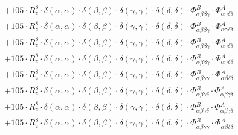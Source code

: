 \documentclass{article}
\begin{document}
\begin{subequations}
\begin{gather}
\begin{array}{c}
 \\[0.2em] 		 + 105 \cdot R_{z}^{8} \cdot \delta{}\left(\alpha{}, \alpha{}\right) \cdot \delta{}\left(\beta{}, \beta{}\right) \cdot \delta{}\left(\gamma{}, \gamma{}\right) \cdot \delta{}\left(\delta{}, \delta{}\right) \cdot \Phi{}^{B}_{\alpha{}\beta{}\beta{}\gamma{}} \cdot \Phi{}^{A}_{\alpha{}\gamma{}\delta{}\delta{}} 
 \\[0.2em] 		 + 105 \cdot R_{z}^{8} \cdot \delta{}\left(\alpha{}, \alpha{}\right) \cdot \delta{}\left(\beta{}, \beta{}\right) \cdot \delta{}\left(\gamma{}, \gamma{}\right) \cdot \delta{}\left(\delta{}, \delta{}\right) \cdot \Phi{}^{B}_{\alpha{}\beta{}\beta{}\gamma{}} \cdot \Phi{}^{A}_{\alpha{}\gamma{}\delta{}\delta{}} 
 \\[0.2em] 		 + 105 \cdot R_{z}^{8} \cdot \delta{}\left(\alpha{}, \alpha{}\right) \cdot \delta{}\left(\beta{}, \beta{}\right) \cdot \delta{}\left(\gamma{}, \gamma{}\right) \cdot \delta{}\left(\delta{}, \delta{}\right) \cdot \Phi{}^{B}_{\alpha{}\beta{}\beta{}\gamma{}} \cdot \Phi{}^{A}_{\alpha{}\gamma{}\delta{}\delta{}} 
 \\[0.2em] 		 + 105 \cdot R_{z}^{8} \cdot \delta{}\left(\alpha{}, \alpha{}\right) \cdot \delta{}\left(\beta{}, \beta{}\right) \cdot \delta{}\left(\gamma{}, \gamma{}\right) \cdot \delta{}\left(\delta{}, \delta{}\right) \cdot \Phi{}^{B}_{\alpha{}\beta{}\beta{}\gamma{}} \cdot \Phi{}^{A}_{\alpha{}\gamma{}\delta{}\delta{}} 
 \\[0.2em] 		 + 105 \cdot R_{z}^{8} \cdot \delta{}\left(\alpha{}, \alpha{}\right) \cdot \delta{}\left(\beta{}, \beta{}\right) \cdot \delta{}\left(\gamma{}, \gamma{}\right) \cdot \delta{}\left(\delta{}, \delta{}\right) \cdot \Phi{}^{B}_{\alpha{}\beta{}\gamma{}\gamma{}} \cdot \Phi{}^{A}_{\alpha{}\beta{}\delta{}\delta{}} 
 \\[0.2em] 		 + 105 \cdot R_{z}^{8} \cdot \delta{}\left(\alpha{}, \alpha{}\right) \cdot \delta{}\left(\beta{}, \beta{}\right) \cdot \delta{}\left(\gamma{}, \gamma{}\right) \cdot \delta{}\left(\delta{}, \delta{}\right) \cdot \Phi{}^{B}_{\alpha{}\beta{}\gamma{}\delta{}} \cdot \Phi{}^{A}_{\alpha{}\beta{}\gamma{}\delta{}} 
 \\[0.2em] 		 + 105 \cdot R_{z}^{8} \cdot \delta{}\left(\alpha{}, \alpha{}\right) \cdot \delta{}\left(\beta{}, \beta{}\right) \cdot \delta{}\left(\gamma{}, \gamma{}\right) \cdot \delta{}\left(\delta{}, \delta{}\right) \cdot \Phi{}^{B}_{\alpha{}\beta{}\gamma{}\delta{}} \cdot \Phi{}^{A}_{\alpha{}\beta{}\gamma{}\delta{}} 
 \\[0.2em] 		 + 105 \cdot R_{z}^{8} \cdot \delta{}\left(\alpha{}, \alpha{}\right) \cdot \delta{}\left(\beta{}, \beta{}\right) \cdot \delta{}\left(\gamma{}, \gamma{}\right) \cdot \delta{}\left(\delta{}, \delta{}\right) \cdot \Phi{}^{B}_{\alpha{}\beta{}\gamma{}\gamma{}} \cdot \Phi{}^{A}_{\alpha{}\beta{}\delta{}\delta{}} 

\end{array}
\end{gather}
\end{subequations}
\end{document}
